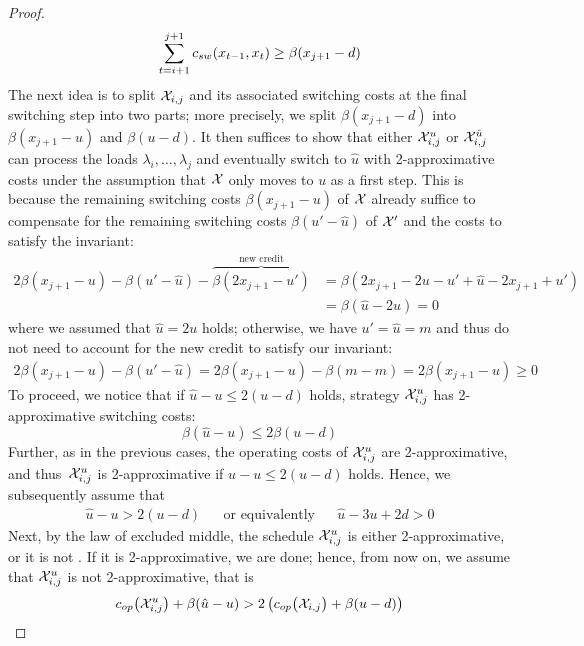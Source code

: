 \begin{proof}
\begin{equation*}
	\sum\limits_{t=i+1}^{j+1}c_{sw}(x_{t-1},x_t)\ge\beta(x_{j+1}-d)
\end{equation*}
The next idea is to split $\mathcal{X}_{i,j}$ and its associated switching costs at the final switching step into two parts; more precisely, we split $\beta(x_{j+1}-d)$ into $\beta(x_{j+1}-u)$ and $\beta(u-d)$. It then suffices to show that either $\mathcal{X}_{i,j}^u$ or $\mathcal{X}_{i,j}^{\hat{u}}$ can process the loads $\lambda_i,\dotsc,\lambda_j$ and eventually switch to $\hat{u}$ with 2-approximative costs under the assumption that $\mathcal{X}$ only moves to $u$ as a first step. This is because the remaining switching costs $\beta(x_{j+1}-u)$ of $\mathcal{X}$ already suffice to compensate for the remaining switching costs $\beta(u'-\hat{u})$ of $\mathcal{X}'$ and the costs to satisfy the invariant:
\begin{align*}
	2\beta(x_{j+1}-u)-\beta(u'-\hat{u})-\overbrace{\beta(2x_{j+1}-u')}^{\text{new credit}}&=\beta(2x_{j+1}-2u-u'+\hat{u}-2x_{j+1}+u')\\
	&=\beta(\hat{u}-2u)=0
\end{align*}
where we assumed that $\hat{u}=2u$ holds; otherwise, we have $u'=\hat{u}=m$ and thus do not need to account for the new credit to satisfy our invariant:
\begin{align*}
	2\beta(x_{j+1}-u)-\beta(u'-\hat{u})=2\beta(x_{j+1}-u)-\beta(m-m)=2\beta(x_{j+1}-u)\ge 0
\end{align*}
To proceed, we notice that if $\hat{u}-u\le2(u-d)$ holds, strategy $\mathcal{X}_{i,j}^u$ has 2-approximative switching costs:
\begin{equation*}
	\beta(\hat{u}-u)\le2\beta(u-d)
\end{equation*}
Further, as in the previous cases, the operating costs of $\mathcal{X}_{i,j}^u$ are 2-approximative, and thus~$\mathcal{X}_{i,j}^u$ is 2-approximative if $\hat{u}-u\le2(u-d)$ holds. Hence, we subsequently assume that 
\begin{align}\label{eq:proof_2_approximative_asm_dist_pos}
	\hat{u}-u>2(u-d)&&\text{or equivalently}&&\hat{u}-3u+2d>0
\end{align}
Next, by the law of excluded middle, the schedule $\mathcal{X}_{i,j}^u$ is either 2-approximative, or it is not . If it is 2-approximative, we are done; hence, from now on, we assume that $\mathcal{X}_{i,j}^u$ is not 2-approximative, that is
\begin{equation*}
	c_{op}\bigl(\mathcal{X}_{i,j}^u\bigr)+\beta(\hat{u}-u)>2\left(c_{op}\bigl(\mathcal{X}_{i,j}\bigr)+\beta(u-d)\right)
\end{equation*}

\end{proof}
